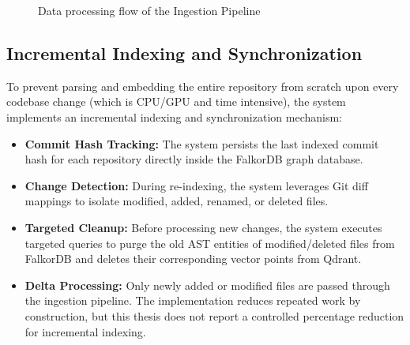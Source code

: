 \documentclass[12pt,letterpaper,oneside]{report}
\begin{document}
\begin{figure}[H]
    \centering
    \caption{Data processing flow of the Ingestion Pipeline}
    \label{fig:ingestion_sequence}
\end{figure}

\subsection{Incremental Indexing and Synchronization}
To prevent parsing and embedding the entire repository from scratch upon every codebase change (which is CPU/GPU and time intensive), the system implements an incremental indexing and synchronization mechanism:
\begin{itemize}
    \item \textbf{Commit Hash Tracking:} The system persists the last indexed commit hash for each repository directly inside the FalkorDB graph database.
    \item \textbf{Change Detection:} During re-indexing, the system leverages Git diff mappings to isolate modified, added, renamed, or deleted files.
    \item \textbf{Targeted Cleanup:} Before processing new changes, the system executes targeted queries to purge the old AST entities of modified/deleted files from FalkorDB and deletes their corresponding vector points from Qdrant.
    \item \textbf{Delta Processing:} Only newly added or modified files are passed through the ingestion pipeline. The implementation reduces repeated work by construction, but this thesis does not report a controlled percentage reduction for incremental indexing.
\end{itemize}
\end{document}
